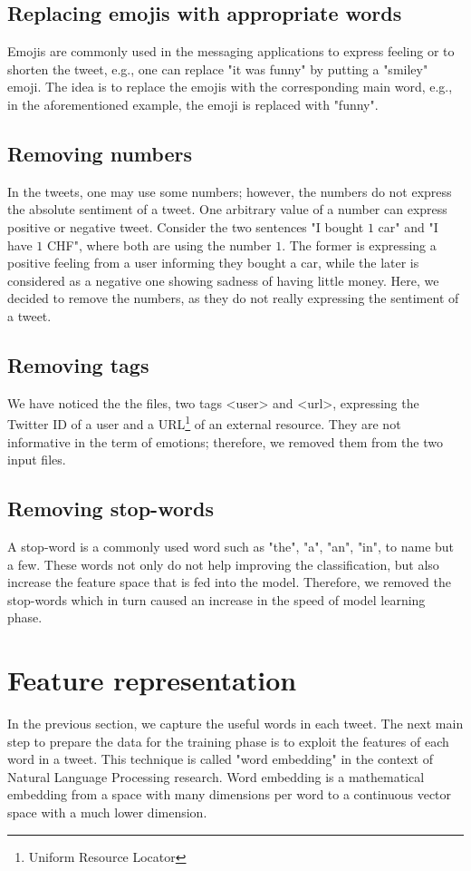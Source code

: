 \documentclass[8pt,conference,compsocconf]{IEEEtran}
\begin{document}
\subsection{Replacing emojis with appropriate words}
Emojis are commonly used in the messaging applications to express feeling or to shorten the tweet, e.g., one can replace "it was funny" by putting a "smiley" emoji. The idea is to replace the emojis with the corresponding main word, e.g., in the aforementioned example, the emoji is replaced with "funny".
\subsection{Removing numbers}
In the tweets, one may use some numbers; however, the numbers do not express the absolute sentiment of a tweet. One arbitrary value of a number can express positive or negative tweet. Consider the two sentences "I bought $1$ car" and "I have $1$ CHF", where both are using the number $1$. The former is expressing a positive feeling from a user informing they bought a car, while the later is considered as a negative one showing sadness of having little money. Here, we decided to remove the numbers, as they do not really expressing the sentiment of a tweet.
\subsection{Removing tags}
We have noticed the the files, two tags <user> and <url>, expressing the Twitter ID of a user and a URL\footnote{Uniform Resource Locator} of an external resource. They are not informative in the term of emotions; therefore, we removed them from the two input files.
\subsection{Removing stop-words}
A stop-word is a commonly used word such as "the", "a", "an", "in", to name but a few. These words not only do not help improving the classification, but also increase the feature space that is fed into the model. Therefore, we removed the stop-words which in turn caused an increase in the speed of model learning phase.

\section{Feature representation}\label{sec:embedding}
In the previous section, we capture the useful words in each tweet. The next main step to prepare the data for the training phase is to exploit the features of each word in a tweet. This technique is called "word embedding" in the context of Natural Language Processing research. Word embedding is a mathematical embedding from a space with many dimensions per word to a continuous vector space with a much lower dimension. 
\end{document}
